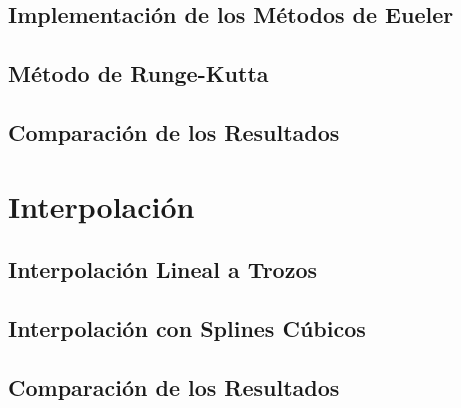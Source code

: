 \documentclass{endm}
\begin{document}
\subsection{Implementación de los Métodos de Eueler}


\subsection{Método de Runge-Kutta}


\subsection{Comparación de los Resultados}


\section{Interpolación}

\subsection{Interpolación Lineal a Trozos}


\subsection{Interpolación con Splines Cúbicos}


\subsection{Comparación de los Resultados}


\clearpage
\printbibliography
\end{document}
